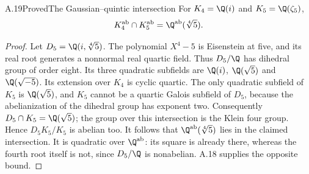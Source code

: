 \begin{statement}{A.19}{Proved}{The Gaussian--quintic intersection}
For $K_4=\Q(i)$ and $K_5=\Q(\zeta_5)$,
\[
 K_4^{\mathrm{ab}}\cap K_5^{\mathrm{ab}}
       =\Q^{\mathrm{ab}}(\sqrt[4]{5}).
\]
\end{statement}
\begin{proof}
Let $D_5=\Q(i,\sqrt[4]{5})$. The polynomial $X^4-5$ is Eisenstein
at five, and its real root generates a nonnormal real quartic field.
Thus $D_5/\Q$ has dihedral group of order eight. Its three quadratic
subfields are $\Q(i)$, $\Q(\sqrt5)$ and $\Q(\sqrt{-5})$.
Its extension over $K_4$ is cyclic quartic. The only quadratic
subfield of $K_5$ is $\Q(\sqrt5)$, and $K_5$ cannot be a quartic
Galois subfield of $D_5$, because the abelianization of the dihedral
group has exponent two. Consequently
$D_5\cap K_5=\Q(\sqrt5)$; the group over this intersection is the
Klein four group. Hence $D_5K_5/K_5$ is abelian too.
It follows that $\Q^{\mathrm{ab}}(\sqrt[4]5)$ lies in the claimed
intersection. It is quadratic over $\Q^{\mathrm{ab}}$: its square
is already there, whereas the fourth root itself is not, since
$D_5/\Q$ is nonabelian. A.18 supplies the opposite bound.
\end{proof}

